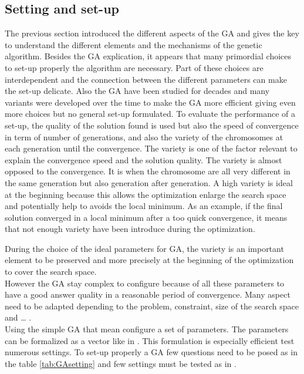 	
\subsection{Setting and  set-up} \label{sec:Setting and  set-up}

The previous section introduced the different aspects of the GA and gives the key to understand the different elements and the mechanisms of the genetic algorithm. Besides the GA explication, it appears that many primordial  choices  to set-up properly the algorithm are necessary. Part of these choices are interdependent and the connection between the different parameters can make the set-up delicate.
Also the GA have been studied for decades and many variants were developed over the time to make the GA more efficient giving even more choices but no general set-up formulated.
To evaluate the  performance of a set-up, the quality of the solution found is used but also the speed of convergence in term of number of generations, and also the variety of the chromosomes at each generation until the convergence. 
The variety is one of the factor relevant to explain the convergence speed and the solution quality.
The variety is almost opposed to the convergence. It is when the chromosome  are all very different in the same generation but also generation after generation. A high variety is ideal at the beginning because this allows the optimization enlarge the search space and potentially help to avoids the local minimum. 
 As an example, if the final solution converged in a local minimum after a too quick convergence, it means that not enough variety have been introduce during the optimization.

During the choice of the ideal parameters for GA, the variety is an important element to be preserved and more precisely at the beginning of the optimization to cover the search space.\\
 
However the GA stay complex to configure because of all these parameters to have a good answer quality in a reasonable period of convergence. Many aspect need to be adapted depending to the problem, constraint, size of the search space and … .  \\ 
Using the simple GA that mean configure a set of parameters. The parameters can be formalized as a vector like in \cite{71*grefenstette1986}. This formulation is especially  efficient test numerous settings. 
To set-up properly a GA few questions need to be posed as in the table \ref{tab:GAsetting} and few settings must be tested as in \cite{73*wright1991,71*grefenstette1986,133*schwefel1984}.

